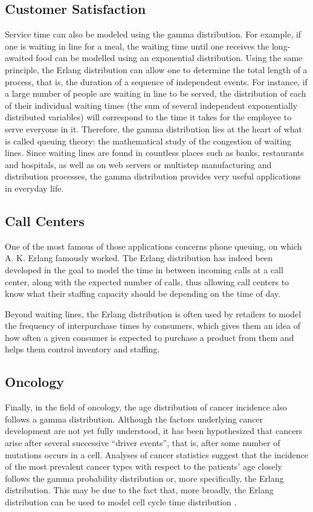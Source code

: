 \documentclass[12pt]{article}
\begin{document}
\subsection{Customer Satisfaction}
Service time can also be modeled using the gamma distribution. For example, if one is waiting in line for a meal, the
waiting time until one receives the long-awaited food can be modelled using an exponential distribution. Using the same
principle, the Erlang distribution can allow one to determine the total length of a process, that is, the duration of a
sequence of independent events. For instance, if a large number of people are waiting in line to be served, the
distribution of each of their individual waiting times (the sum of several independent exponentially distributed
variables) will correspond to the time it takes for the employee to serve everyone in it. Therefore, the gamma
distribution lies at the heart of what is called queuing theory: the mathematical study of the congestion of waiting
lines. Since waiting lines are found in countless places such as banks, restaurants and hospitals, as well as on web
servers or multistep manufacturing and distribution processes, the gamma distribution provides very useful applications
in everyday life.

\subsection{Call Centers}
One of the most famous of those applications concerns phone queuing, on which A. K. Erlang famously worked. The Erlang
distribution has indeed been developed in the goal to model the time in between incoming calls at a call center, along
with the expected number of calls, thus allowing call centers to know what their staffing capacity should be depending
on the time of day.

Beyond waiting lines, the Erlang distribution is often used by retailers to model the frequency of interpurchase times
by consumers, which gives them an idea of how often a given consumer is expected to purchase a product from them and
helps them control inventory and staffing.

\subsection{Oncology}
Finally, in the field of oncology, the age distribution of cancer incidence also follows a gamma distribution. Although
the factors underlying cancer development are not yet fully understood, it has been hypothesized that cancers arise
after several successive “driver events”, that is, after some number of mutations occurs in a cell. Analyses of cancer
statistics suggest that the incidence of the most prevalent cancer types with respect to the patients' age closely
follows the gamma probability distribution or, more specifically, the Erlang distribution. This may be due to the fact
that, more broadly, the Erlang distribution can be used to model cell cycle time
distribution\cite{belikovNumberKeyCarcinogenic2017} .
\end{document}
